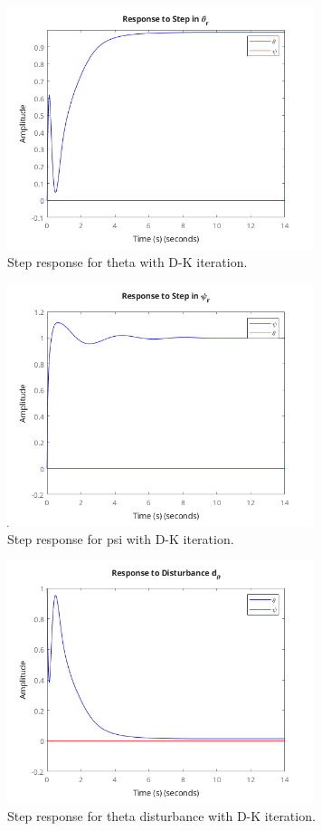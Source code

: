 \documentclass{article}
\begin{document}
\begin{figure}[H]
    \centering
    \includegraphics[width=0.8\textwidth]{stepThetaDK.png}
    \caption{Step response for theta with D-K iteration.}
    \label{fig:stepThetaDK}
\end{figure}

\begin{figure}[H]
    \centering
    \includegraphics[width=0.8\textwidth]{stepPsiDK.png}
    \caption{Step response for psi with D-K iteration.}
    \label{fig:stepPsiDK}
\end{figure}

\begin{figure}[H]
    \centering
    \includegraphics[width=0.8\textwidth]{stepDthetaDK.png}
    \caption{Step response for theta disturbance with D-K iteration.}
    \label{fig:stepDthetaDK}
\end{figure}
\end{document}
